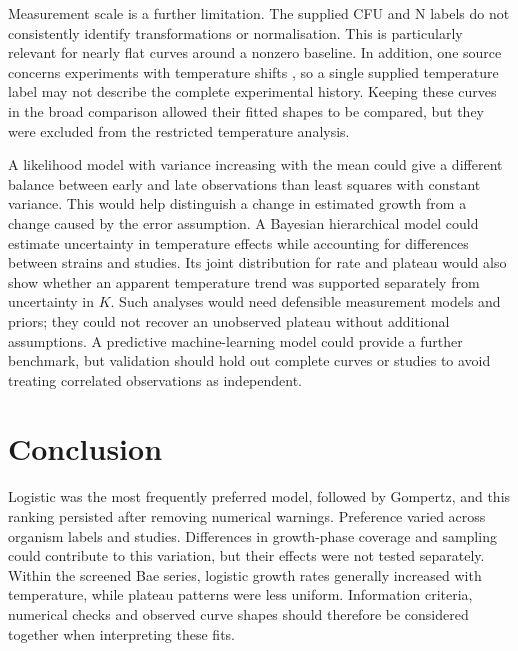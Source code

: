 \documentclass[11pt,a4paper]{article}
\begin{document}
Measurement scale is a further limitation. The supplied CFU and N labels do not consistently identify transformations or normalisation. This is particularly relevant for nearly flat curves around a nonzero baseline. In addition, one source concerns experiments with temperature shifts \citep{Zwietering1994}, so a single supplied temperature label may not describe the complete experimental history. Keeping these curves in the broad comparison allowed their fitted shapes to be compared, but they were excluded from the restricted temperature analysis.

A likelihood model with variance increasing with the mean could give a different balance between early and late observations than least squares with constant variance. This would help distinguish a change in estimated growth from a change caused by the error assumption. A Bayesian hierarchical model could estimate uncertainty in temperature effects while accounting for differences between strains and studies. Its joint distribution for rate and plateau would also show whether an apparent temperature trend was supported separately from uncertainty in $K$. Such analyses would need defensible measurement models and priors; they could not recover an unobserved plateau without additional assumptions. A predictive machine-learning model could provide a further benchmark, but validation should hold out complete curves or studies to avoid treating correlated observations as independent.

\section{Conclusion}
Logistic was the most frequently preferred model, followed by Gompertz, and this ranking persisted after removing numerical warnings. Preference varied across organism labels and studies. Differences in growth-phase coverage and sampling could contribute to this variation, but their effects were not tested separately. Within the screened Bae series, logistic growth rates generally increased with temperature, while plateau patterns were less uniform. Information criteria, numerical checks and observed curve shapes should therefore be considered together when interpreting these fits.
\end{document}
